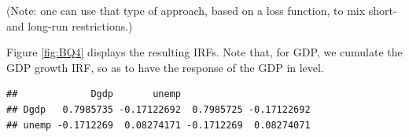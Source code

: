 \documentclass[
  11pt,
]{book}
\newenvironment{Shaded}{\begin{snugshade}}{\end{snugshade}}
\newcommand{\DecValTok}[1]{\textcolor[rgb]{0.00,0.00,0.81}{#1}}
\newcommand{\FunctionTok}[1]{\textcolor[rgb]{0.13,0.29,0.53}{\textbf{#1}}}
\newcommand{\NormalTok}[1]{#1}
\newcommand{\OtherTok}[1]{\textcolor[rgb]{0.56,0.35,0.01}{#1}}
\newcommand{\SpecialCharTok}[1]{\textcolor[rgb]{0.81,0.36,0.00}{\textbf{#1}}}
\theoremstyle{definition}
\theoremstyle{definition}
\theoremstyle{definition}
\theoremstyle{definition}
\theoremstyle{remark}
\begin{document}
(Note: one can use that type of approach, based on a loss function, to mix short- and long-run restrictions.)

Figure \ref{fig:BQ4} displays the resulting IRFs. Note that, for GDP, we cumulate the GDP growth IRF, so as to have the response of the GDP in level.

\begin{Shaded}
\end{Shaded}

\begin{verbatim}
##             Dgdp       unemp                       
## Dgdp   0.7985735 -0.17122692  0.7985725 -0.17122692
## unemp -0.1712269  0.08274171 -0.1712269  0.08274071
\end{verbatim}
\end{document}
